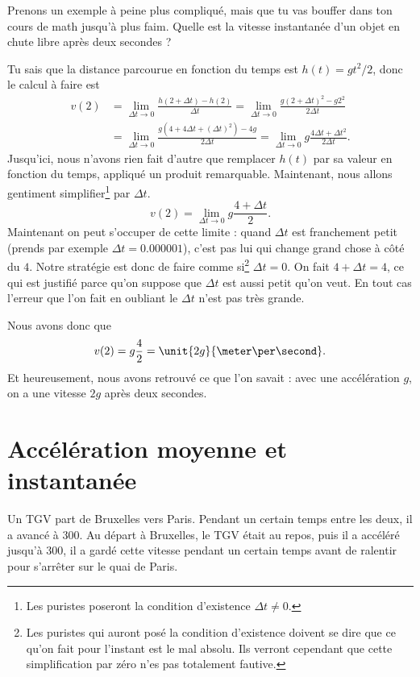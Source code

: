 \begin{exemple}		\label{ExDerchutelobre}
Prenons un exemple à peine plus compliqué, mais que tu vas bouffer dans ton cours de math jusqu'à plus faim. Quelle est la vitesse instantanée d'un objet en chute libre après deux secondes ?

Tu sais que la distance parcourue en fonction du temps est $h(t)=gt^2/2$, donc le calcul à faire est
\begin{align*}
  v(2)	&=\lim_{\Delta t\to 0}\frac{ h(2+\Delta t)-h(2) }{ \Delta t }=\lim_{\Delta t\to 0}\frac{ g(2+\Delta t)^2-g2^2 }{ 2\Delta t }\\
	&=\lim_{\Delta t\to 0}\frac{ g(4+4\Delta t+(\Delta t)^2)-4g }{ 2\Delta t }=\lim_{\Delta t\to 0}g\frac{ 4\Delta t+\Delta t^2 }{ 2\Delta t }.
\end{align*}
Jusqu'ici, nous n'avons rien fait d'autre que remplacer $h(t)$ par sa valeur en fonction du temps, appliqué un produit remarquable. Maintenant, nous allons gentiment simplifier\footnote{Les puristes poseront la condition d'existence $\Delta t\neq 0$.} par $\Delta t$. 
\[ 
  v(2)=\lim_{\Delta t\to 0}g\frac{ 4+\Delta t }{ 2 }.
\]
Maintenant on peut s'occuper de cette limite : quand $\Delta t$ est franchement petit (prends par exemple $\Delta t=0.000001$), c'est pas lui qui change grand chose à côté du $4$. Notre stratégie est donc de \og faire comme si\footnote{Les puristes qui auront posé la condition d'existence doivent se dire que ce qu'on fait pour l'instant est le mal absolu. Ils verront cependant que cette \og simplification par zéro\fg{}  n'es pas totalement fautive.}\fg{}  $\Delta t=0$. On fait $4+\Delta t=4$, ce qui est justifié parce qu'on suppose que $\Delta t$ est aussi petit qu'on veut. En tout cas l'erreur que l'on fait en \og oubliant\fg{}  le $\Delta t$ n'est pas très grande.

Nous avons donc que
\[ 
  v(2)=g\frac{ 4 }{ 2 }=\unit{2g}{\meter\per\second}.
\]
Et heureusement, nous avons retrouvé ce que l'on savait : avec une accélération $g$, on a une vitesse $2g$ après deux secondes.
\end{exemple}

\section{Accélération moyenne et instantanée}

Un TGV part de Bruxelles vers Paris. Pendant un certain temps entre les deux, il a avancé à \unit{300}{\kilo\meter\per\hour}. Au départ à Bruxelles, le TGV était au repos, puis il a accéléré jusqu'à \unit{300}{\kilo\meter\per\hour}, il a gardé cette vitesse pendant un certain temps avant de ralentir pour s'arrêter sur le quai de Paris.

